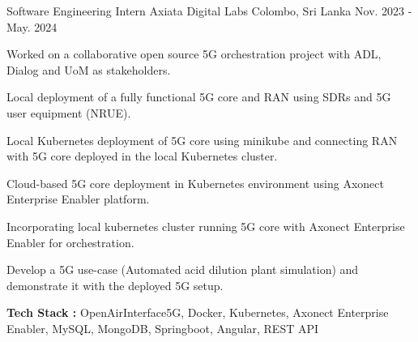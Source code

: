 

\begin{cventries}


\cventry
{Software Engineering Intern} %
{Axiata Digital Labs} %
{Colombo, Sri Lanka} %
{Nov. 2023 - May. 2024} %
{ %
\begin{cvitems}
\item {Worked on a collaborative open source 5G orchestration project with ADL, Dialog and UoM as stakeholders.}
\item {Local deployment of a fully functional 5G core and RAN using SDRs and 5G user equipment (NRUE).}
\item {Local Kubernetes deployment of 5G core using minikube and connecting RAN with 5G core deployed in the local Kubernetes cluster.}
\item {Cloud-based 5G core deployment in Kubernetes environment using Axonect Enterprise Enabler platform.}
\item {Incorporating local kubernetes cluster running 5G core with Axonect Enterprise Enabler for orchestration.}
\item {Develop a 5G use-case (Automated acid dilution plant simulation) and demonstrate it with the deployed 5G setup.}
\item \textbf{Tech Stack :} {OpenAirInterface5G, Docker, Kubernetes, Axonect Enterprise Enabler, MySQL, MongoDB, Springboot, Angular, REST API}
\end{cvitems}
}


\end{cventries}
